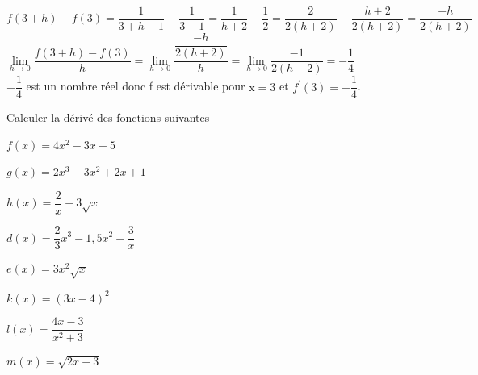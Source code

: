 \documentclass[12pt,a4paper]{article}  %
\begin{document}
\begin{corrBox}
    $f(3+h)-f(3)=\dfrac{1}{3+h-1}-\dfrac{1}{3-1}=\dfrac{1}{h+2}-\dfrac{1}{2}=\dfrac{2}{2(h+2)}-\dfrac{h+2}{2(h+2)}=\dfrac{-h}{2(h+2)}$\\
    $\lim\limits_{h \rightarrow 0} \dfrac{f(3+h)-f(3)}{h}=\lim\limits_{h \rightarrow 0} \dfrac{\dfrac{-h}{2(h+2)}}{h}=\lim\limits_{h \rightarrow 0} \dfrac{-1}{2(h+2)}=-\dfrac{1}{4}$\\
    $-\dfrac{1}{4}$ est un nombre réel donc f est dérivable pour $\mathrm{x}=3$ et $f^{\prime}(3)=-\dfrac{1}{4}$.
\end{corrBox}


Calculer la dérivé des fonctions suivantes
\begin{enumMet}
    \item $f(x)=4 x^{2}-3 x-5$\quad {}
    \item {} $g(x)=2 x^{3}-3 x^{2}+2 x+1$\quad {}
    \item $h(x)=\dfrac{2}{x}+3 \sqrt{x}$\quad {}
    \item $d(x)=\dfrac{2}{3} x^{3}-1,5 x^{2}-\dfrac{3}{x}$\quad {}
    \item $e(x)=3 x^{2} \sqrt{x}$\quad {}
    \item {} $k(x)=(3x-4)^{2}$\quad {}
    \item $l(x)=\dfrac{4x-3}{x^{2}+3}$\quad {}
    \item $m(x)=\sqrt{2x+3}$\quad {}
\end{enumMet}
\end{document}
